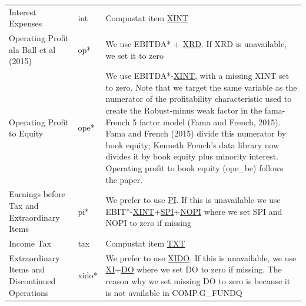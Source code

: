 \documentclass[12pt,title,fleqn]{article}
\begin{document}
{\begin{longtable}{@{\extracolsep{\fill}}|m{5cm}|l|m{8cm}|@{}}
	Interest Expenses &  int & Compustat item \href{https://wrds-www.wharton.upenn.edu/data-dictionary/form_metadata/comp_na_daily_all_funda_incomestatementitems/XINT/}{XINT} \\
	
	Operating Profit ala Ball et al (2015) & op\mbox{*} & We use EBITDA\mbox{*} + \href{https://wrds-www.wharton.upenn.edu/data-dictionary/form_metadata/comp_na_daily_all_funda_incomestatementitems/XRD/}{XRD}. If XRD is unavailable, we set it to zero \\
	
	Operating Profit to Equity & ope\mbox{*} & We use EBITDA\mbox{*}-\href{https://wrds-www.wharton.upenn.edu/data-dictionary/form_metadata/comp_na_daily_all_funda_incomestatementitems/XINT/}{XINT}, with a missing XINT set to zero. Note that we target the same variable as the numerator of the profitability characteristic used to create the Robust-minus weak factor in the fama-French 5 factor model (Fama and French, 2015). Fama and French (2015) divide this numerator by book equity; Kenneth French's data library now divides it by book equity plus minority interest. Operating profit to book equity (ope\_be) follows the paper. \\
	
	Earnings before Tax and Extraordinary Items & pi\mbox{*} & We prefer to use \href{https://wrds-www.wharton.upenn.edu/data-dictionary/form_metadata/comp_na_daily_all_funda_incomestatementitems/PI/}{PI}. If this is unavailable we use EBIT\mbox{*}-\href{https://wrds-www.wharton.upenn.edu/data-dictionary/form_metadata/comp_na_daily_all_funda_incomestatementitems/XINT/}{XINT}+\href{https://wrds-www.wharton.upenn.edu/data-dictionary/form_metadata/comp_na_daily_all_funda_incomestatementitems/SPI/}{SPI}+\href{https://wrds-www.wharton.upenn.edu/data-dictionary/form_metadata/comp_na_daily_all_funda_incomestatementitems/NOPI/}{NOPI} where we set SPI and NOPI to zero if missing\\
	
	Income Tax & tax & Compustat item \href{https://wrds-www.wharton.upenn.edu/data-dictionary/form_metadata/comp_na_daily_all_funda_incomestatementitems/TXT/}{TXT}\\
	
	Extraordinary Items and Discontinued Operations &  xido\mbox{*} & We prefer to use \href{https://wrds-www.wharton.upenn.edu/data-dictionary/form_metadata/comp_na_daily_all_funda_incomestatementitems/XIDO/}{XIDO}. If this is unavailable, we use \href{https://wrds-www.wharton.upenn.edu/data-dictionary/form_metadata/comp_na_daily_all_funda_incomestatementitems/XI/}{XI}+\href{https://wrds-www.wharton.upenn.edu/data-dictionary/form_metadata/comp_na_daily_all_funda_incomestatementitems/DO/}{DO} where we set DO to zero if missing. The reason why we set missing DO to zero is because it is not available in COMP.G\_FUNDQ \\
	

\end{longtable}}
\end{document}
